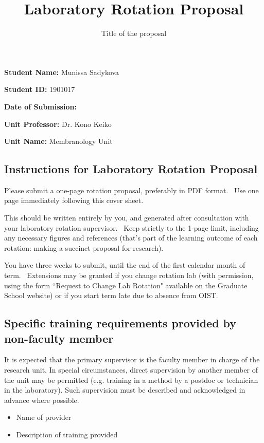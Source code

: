 \documentclass[fontsize=11pt, twocolumn]{scrartcl}	 %
\title{\vspace{-2.8cm}  \color{DarkRed} Laboratory Rotation Proposal}
\subtitle{Title of the proposal %
\vspace{-2cm} }
\date{} %
\begin{document}
\maketitle %
\thispagestyle{fancy} %

\textbf{Student Name:}  Munissa Sadykova

\textbf{Student ID:} 1901017

\textbf{Date of Submission:} 

 \textbf{Unit Professor:} Dr. Kono Keiko

\textbf{Unit Name:} 	Membranology Unit

\subsection*{Instructions for Laboratory Rotation Proposal}

Please submit a one-page rotation proposal, preferably in PDF format.  Use one page immediately following this cover sheet.

This should be written entirely by you, and generated after consultation with your laboratory rotation supervisor.  Keep strictly to the 1-page limit, including any necessary figures and references (that's part of the learning outcome of each rotation: making a succinct proposal for research).

You have three weeks to submit, until the end of the first calendar month of term.  Extensions may be granted if you change rotation lab (with permission, using the form ``Request to Change Lab Rotation" available on the Graduate School website) or if you start term late due to absence from OIST.

\vfill \break

\subsection*{Specific training requirements provided by non-faculty member}

It is expected that the primary supervisor is the faculty member in charge of the research unit. In special circumstances, direct supervision by another member of the unit may be permitted  (e.g. training in a method by a postdoc or technician in the laboratory).  Such supervision must be described and acknowledged in advance where possible.

\begin{itemize}
\item{Name of provider} 
\item{Description of training provided}
\end{itemize}
\end{document}
